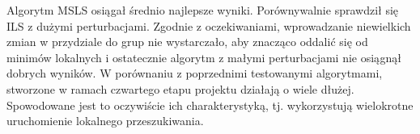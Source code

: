 \documentclass[main.tex]{subfiles}
\begin{document}
\begin{table}[H]
\centering
\caption{Wyniki eksperymentów obliczeniowych}
\label{table:wyniki}
\end{table}
Algorytm MSLS osiągał średnio najlepsze wyniki. Porównywalnie sprawdził się ILS z dużymi perturbacjami. Zgodnie z oczekiwaniami, wprowadzanie niewielkich zmian w przydziale do grup nie wystarczało, aby znacząco oddalić się od minimów lokalnych i ostatecznie algorytm z małymi perturbacjami nie osiągnął dobrych wyników. W porównaniu z poprzednimi testowanymi algorytmami, stworzone w ramach czwartego etapu projektu działają o wiele dłużej. Spowodowane jest to oczywiście ich charakterystyką, tj. wykorzystują wielokrotne uruchomienie lokalnego przeszukiwania.
\end{document}
